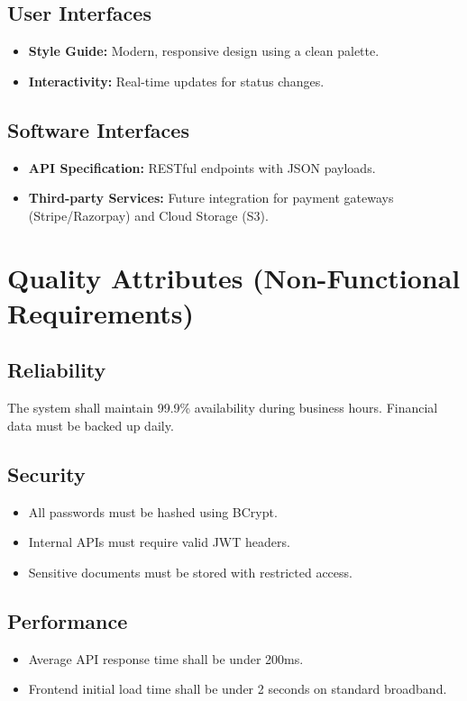 \documentclass[12pt,a4paper]{article}
\begin{document}
\subsection{User Interfaces}
\begin{itemize}
    \item \textbf{Style Guide:} Modern, responsive design using a clean palette.
    \item \textbf{Interactivity:} Real-time updates for status changes.
\end{itemize}

\subsection{Software Interfaces}
\begin{itemize}
    \item \textbf{API Specification:} RESTful endpoints with JSON payloads.
    \item \textbf{Third-party Services:} Future integration for payment gateways (Stripe/Razorpay) and Cloud Storage (S3).
\end{itemize}

\section{Quality Attributes (Non-Functional Requirements)}

\subsection{Reliability}
The system shall maintain 99.9\% availability during business hours. Financial data must be backed up daily.

\subsection{Security}
\begin{itemize}
    \item All passwords must be hashed using BCrypt.
    \item Internal APIs must require valid JWT headers.
    \item Sensitive documents must be stored with restricted access.
\end{itemize}

\subsection{Performance}
\begin{itemize}
    \item Average API response time shall be under 200ms.
    \item Frontend initial load time shall be under 2 seconds on standard broadband.
\end{itemize}
\end{document}
